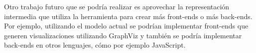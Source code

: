 Otro trabajo futuro que se podría realizar es aprovechar la representación intermedia que utiliza la herramienta para crear más front-ends o más back-ends. Por ejemplo, utilizando el modelo actual se podrían implementar front-ends que generen visualizaciones utilizando GraphViz y también se podría implementar back-ends en otros lenguajes, cómo por ejemplo JavaScript.
